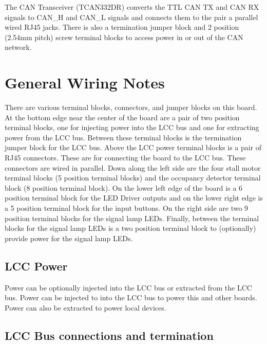 The CAN Transceiver (TCAN332DR) converts the TTL CAN TX and CAN RX signals to 
CAN\_H and CAN\_L signals and connects them to the pair a parallel wired RJ45 
jacks.  There is also a termination jumper block and 2 position (2.54mm pitch) 
screw terminal blocks to access power in or out of the CAN network.

\clearpage

\section{General Wiring Notes}

There are various terminal blocks, connectors, and jumper blocks on this 
board.  At the bottom edge near the center of the board are a pair of two 
position terminal blocks, one for injecting power into the LCC bus and one for 
extracting power from the LCC bus. Between these terminal blocks is the 
termination jumper block for the LCC bus.  Above the LCC power terminal blocks 
is a pair of RJ45 connectors. These are for connecting the board to the LCC 
bus. These connectors are wired in parallel. Down along the left side 
are the four stall motor terminal blocks (5 position terminal blocks) 
and the occupancy detector terminal block (8 position terminal block).  On the 
lower left edge of the board is a 6 position terminal block for the LED Driver 
outputs and on the lower right edge is a 5 position terminal block for the 
input buttons.  On the right side are two 9 position terminal blocks for the 
signal lamp LEDs. Finally, between the terminal blocks for the signal lamp 
LEDs is a two position terminal block to (optionally) provide power for the 
signal lamp LEDs.

\subsection{LCC Power}

Power can be optionally injected into the LCC bus or extracted from the LCC 
bus. Power can be injected to into the LCC bus to power this and other boards. 
Power can also be extracted to power local devices.

\subsection{LCC Bus connections and termination}

